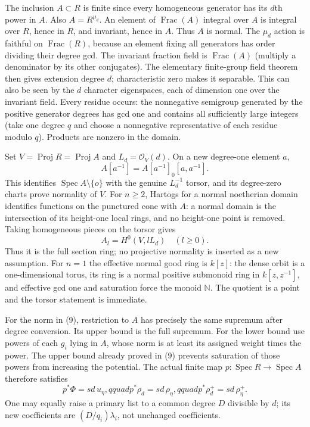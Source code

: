 \documentclass[
  11pt,
]{article}
\begin{document}
The inclusion \(A\subset R\) is finite since every homogeneous generator
has its \(d\)th power in \(A\). Also \(A=R^{\mu_d}\). An element of
\(\operatorname{Frac}(A)\) integral over \(A\) is integral over \(R\),
hence in \(R\), and invariant, hence in \(A\). Thus \(A\) is normal. The
\(\mu_d\) action is faithful on \(\operatorname{Frac}(R)\), because an
element fixing all generators has order dividing their degree gcd. The
invariant fraction field is \(\operatorname{Frac}(A)\) (multiply a
denominator by its other conjugates). The elementary finite-group field
theorem then gives extension degree \(d\); characteristic zero makes it
separable. This can also be seen by the \(d\) character eigenspaces,
each of dimension one over the invariant field. Every residue occurs:
the nonnegative semigroup generated by the positive generator degrees
has gcd one and contains all sufficiently large integers (take one
degree \(q\) and choose a nonnegative representative of each residue
modulo \(q\)). Products are nonzero in the domain.

Set \(V=\operatorname{Proj}R=\operatorname{Proj}A\) and
\(L_d=\mathcal O_V(d)\). On a new degree-one element \(a\),
\[ A[a^{-1}]=A[a^{-1}]_0[a,a^{-1}].\] This identifies
\(\operatorname{Spec}A\setminus\{o\}\) with the genuine \(L_d^{-1}\)
torsor, and its degree-zero charts prove normality of \(V\). For
\(n\geq2\), Hartogs for a normal noetherian domain identifies functions
on the punctured cone with \(A\): a normal domain is the intersection of
its height-one local rings, and no height-one point is removed. Taking
homogeneous pieces on the torsor gives
\[ A_l=H^0(V,lL_d)\quad(l\geq0).\] Thus it is the full section ring; no
projective normality is inserted as a new assumption. For \(n=1\) the
effective normal good ring is \(k[z]\): the dense orbit is a
one-dimensional torus, its ring is a normal positive submonoid ring in
\(k[z,z^{-1}]\), and effective gcd one and saturation force the monoid
\(\mathbb N\). The quotient is a point and the torsor statement is
immediate.

For the norm in (9), restriction to \(A\) has precisely the same
supremum after degree conversion. Its upper bound is the full supremum.
For the lower bound use powers of each \(g_i\) lying in \(A\), whose
norm is at least its assigned weight times the power. The upper bound
already proved in (9) prevents saturation of those powers from
increasing the potential. The actual finite map
\(p:\operatorname{Spec}R\to\operatorname{Spec}A\) therefore satisfies
\[ p^*\Phi=sd\,u_\eta,qquad p^*\rho_d=sd\,\rho_\eta,qquad
 p^*\rho_d^+=sd\,\rho_\eta^+.                                           \tag{13}\]
One may equally raise a primary list to a common degree \(D\) divisible
by \(d\); its new coefficients are \((D/q_i)\lambda_i\), not unchanged
coefficients.
\end{document}
